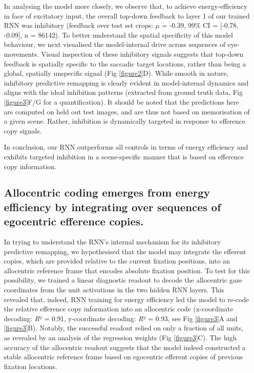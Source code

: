 \documentclass[10pt,letterpaper]{article}
\begin{document}
In analysing the model more closely, we observe that, to achieve energy-efficiency in face of excitatory input, the overall top-down feedback to layer 1 of our trained RNN was inhibitory (feedback over test set crops: $\mu$ = -0.39, 99\% CI = [-0.78, -0.09], n = 86142). To better understand the spatial specificity of this model behaviour, we next visualised the model-internal drive across sequences of eye-movements. Visual inspection of these inhibitory signals suggests that top-down feedback is spatially specific to the saccadic target locations, rather than being a global, spatially unspecific signal (Fig \ref{figure2}D). While smooth in nature, inhibitory predictive remapping is clearly evident in model-internal dynamics and aligns with the ideal inhibition patterns (extracted from ground truth data, Fig \ref{figure3}F/G for a quantification). It should be noted that the predictions here are computed on held out test images, and are thus not based on memorisation of a given scene. Rather, inhibition is dynamically targeted in response to efference copy signals.

In conclusion, our RNN outperforms all controls in terms of energy efficiency and exhibits targeted inhibition in a scene-specific manner that is based on efference copy information.

\subsection{Allocentric coding emerges from energy efficiency by integrating over sequences of egocentric efference copies.} In trying to understand the RNN’s internal mechanism for its inhibitory predictive remapping, we hypothesised that the model may integrate the efferent copies, which are provided relative to the current fixation positions, into an allocentric reference frame that encodes absolute fixation position. To test for this possibility, we trained a linear diagnostic readout to decode the allocentric gaze coordinates from the unit activations in the two hidden RNN layers. This revealed that, indeed, RNN training for energy efficiency led the model to re-code the relative efference copy information into an allocentric code (x-coordinate decoding: \textit{R}² = 0.91, y-coordinate decoding: \textit{R}² = 0.93, see Fig \ref{figure3}A and \ref{figure3}B). Notably, the successful readout relied on only a fraction of all units, as revealed by an analysis of the regression weights (Fig \ref{figure3}C). The high accuracy of the allocentric readout suggests that the model indeed constructed a stable allocentric reference frame based on egocentric efferent copies of previous fixation locations.
\end{document}
